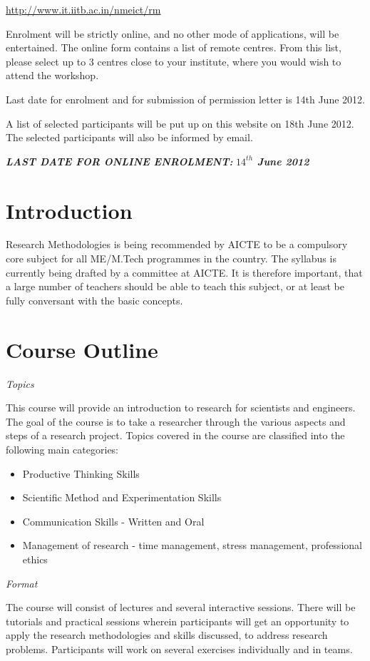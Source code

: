 \documentclass[notuble,10pt,a4paper]{leaflet}
\begin{document}
\url{http://www.it.iitb.ac.in/nmeict/rm}

Enrolment will be strictly online, and no other mode of applications, will be entertained. The online form contains a list of remote centres. From this list, please select up to 3 centres close to your institute, where you would wish to attend the workshop.


Last date for enrolment and for submission of permission letter is 14th June 2012.



A list of selected participants will be put up on this website on 18th June 2012. The selected participants will also be informed by email.

\emph{\textbf{LAST DATE FOR ONLINE ENROLMENT:}}
\emph{\textbf{$14^{th}$ June 2012}}
\newpage

\section{{\Large Introduction}}
Research Methodologies is being recommended by
AICTE to be a compulsory core subject for all ME/M.Tech
programmes in the country. The syllabus is currently being
drafted by a committee at AICTE. It is therefore important,
that a large number of teachers should be able to teach
this subject, or at least be fully conversant with the basic
concepts.


\section{{\Large Course Outline}}
\textit{Topics}

This course will provide an introduction to research for scientists and engineers. The goal of the course is to take a researcher through the various aspects and steps of a research project. Topics covered in the course are classified into the following main categories:
\begin{itemize}
\item Productive Thinking Skills 
\item Scientific Method and Experimentation Skills 
\item Communication Skills - Written and Oral 
\item Management of research - time management, stress management, professional ethics 
\end{itemize}

\textit{Format}

The course will consist of lectures and several interactive sessions. There will be tutorials and practical sessions wherein participants will get an opportunity to apply the research methodologies and skills discussed, to address research problems. Participants will work on several exercises individually and in teams.
\end{document}
